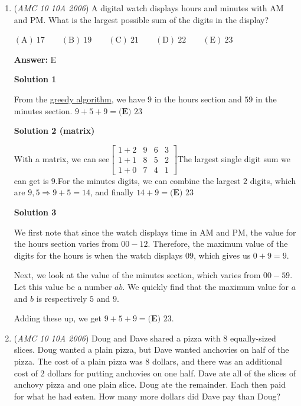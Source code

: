 \begin{enumerate}
We can see this is a combined ratio of $8$, $(5+3)$. We can equalize by doing $30\div5=6$, and $6\cdot3=\boxed{\textbf{(B) }18}$. With the common ratio of $8$ and difference ratio of $6$, we see $6\cdot8=30+18$. Therefore, we can see our answer is correct.

 


	\item (\textit{AMC 10 10A 2006}) A digital watch displays hours and minutes with AM and PM.  What is the largest possible sum of the digits in the display?


 $\mathrm{(A)}\ 17\qquad\mathrm{(B)}\ 19\qquad\mathrm{(C)}\ 21\qquad\mathrm{(D)}\ 22\qquad\mathrm{(E)}\ 23$

 \textbf{Answer: }E



\textbf{Solution 1}

From the \href{https://artofproblemsolving.com/wiki/index.php?title=Greedy\_algorithm}{greedy algorithm}, we have $9$ in the hours section and $59$ in the minutes section. $9+5+9=\boxed{\textbf{(E) }23}$




\textbf{Solution 2 (matrix)}

With a matrix, we can see$\begin{bmatrix} 1+2&9&6&3\\ 1+1&8&5&2\\ 1+0&7&4&1 \end{bmatrix}$The largest single digit sum we can get is $9$.For the minutes digits, we can combine the largest $2$ digits, which are $9,5 \Rightarrow 9+5=14$, and finally $14+9=\boxed{\textbf{(E) }23}$




\textbf{Solution 3}

We first note that since the watch displays time in AM and PM, the value for the hours section varies from $00-12$. Therefore, the maximum value of the digits for the hours is when the watch displays $09$, which gives us $0+9=9$.

 Next, we look at the value of the minutes section, which varies from $00-59$. Let this value be a number $ab$. We quickly find that the maximum value for $a$ and $b$ is respectively $5$ and $9$.

 Adding these up, we get $9+5+9=\boxed{\textbf{(E) }23}$.

 


	\item (\textit{AMC 10 10A 2006}) Doug and Dave shared a pizza with 8 equally-sized slices.  Doug wanted a plain pizza, but Dave wanted anchovies on half of the pizza.  The cost of a plain pizza was 8 dollars, and there was an additional cost of 2 dollars for putting anchovies on one half.  Dave ate all of the slices of anchovy pizza and one plain slice.  Doug ate the remainder.  Each then paid for what he had eaten.  How many more dollars did Dave pay than Doug?



\end{enumerate}

